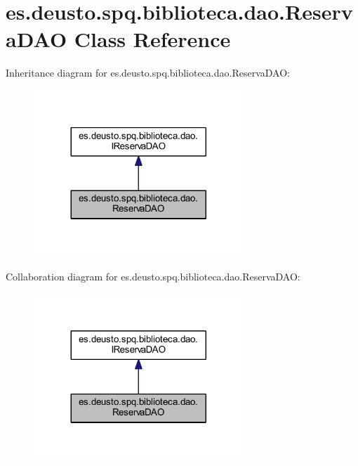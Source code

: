 \hypertarget{classes_1_1deusto_1_1spq_1_1biblioteca_1_1dao_1_1_reserva_d_a_o}{}\section{es.\+deusto.\+spq.\+biblioteca.\+dao.\+Reserva\+D\+AO Class Reference}
\label{classes_1_1deusto_1_1spq_1_1biblioteca_1_1dao_1_1_reserva_d_a_o}


Inheritance diagram for es.\+deusto.\+spq.\+biblioteca.\+dao.\+Reserva\+D\+AO\+:
\nopagebreak
\begin{figure}[H]
\begin{center}
\leavevmode
\includegraphics[width=224pt]{classes_1_1deusto_1_1spq_1_1biblioteca_1_1dao_1_1_reserva_d_a_o__inherit__graph}
\end{center}
\end{figure}


Collaboration diagram for es.\+deusto.\+spq.\+biblioteca.\+dao.\+Reserva\+D\+AO\+:
\nopagebreak
\begin{figure}[H]
\begin{center}
\leavevmode
\includegraphics[width=224pt]{classes_1_1deusto_1_1spq_1_1biblioteca_1_1dao_1_1_reserva_d_a_o__coll__graph}
\end{center}
\end{figure}
